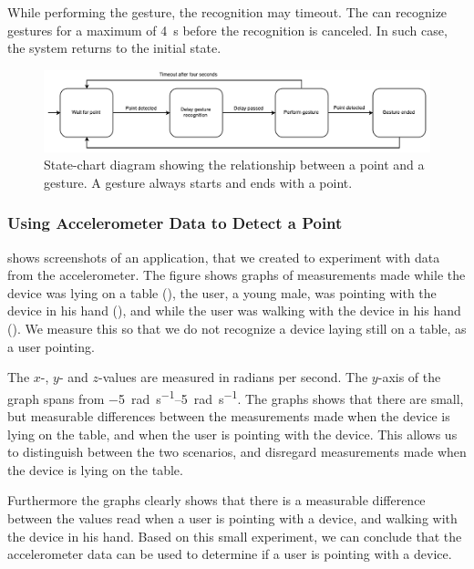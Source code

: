 While performing the gesture, the recognition may timeout. 
The \threedollar can recognize gestures for a maximum of \SI{4}{\second} before the recognition is canceled. 
In such case, the system returns to the initial state.

\begin{figure}[h]
\centering
\includegraphics[width=\textwidth]{images/point-to-gesture-state-diagram}
\caption{State-chart diagram showing the relationship between a point and a gesture. A gesture always starts and ends with a point.}
\label{fig:point-to-gesture-state-diagram}
\end{figure}

\subsubsection{Using Accelerometer Data to Detect a Point}

 shows screenshots of an application, 
that we created to experiment with data from the accelerometer. 
The figure shows graphs of measurements made while the device was lying on a table (), 
the user, a young male, was pointing with the device in his hand (), 
and while the user was walking with the device in his hand ().
We measure this so that we do not recognize a device laying still on a table, 
as a user pointing.
 
The $x$-, $y$- and $z$-values are measured in radians per second. 
The $y$-axis of the graph spans from \SIrange{-5}{5}{\radian\per\second}. 
The graphs shows that there are small, 
but measurable differences between the measurements made when the device is lying on the table,
and when the user is pointing with the device. 
This allows us to distinguish between the two scenarios, 
and disregard measurements made when the device is lying on the table. 

Furthermore the graphs clearly shows that there is a measurable difference between the values read when a user is pointing with a device, 
and walking with the device in his hand. 
Based on this small experiment, 
we can conclude that the accelerometer data can be used to determine if a user is pointing with a device.

